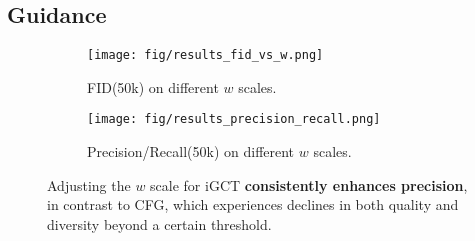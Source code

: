 \vspace{-0.3cm}
\subsection{Guidance}
\label{sec:guidance}
\vspace{-0.15cm}

\begin{figure}[t!]  
    \centering
    \begin{subfigure}[b]{0.44\textwidth}
    \texttt{[image: fig/results\_fid\_vs\_w.png]} 
        \vspace{-1.4em}
        \caption{FID(50k) on different \(w\) scales.}
    \end{subfigure}
    \hfill
    \begin{subfigure}[b]{0.45\textwidth}
    \texttt{[image: fig/results\_precision\_recall.png]} 
        \vspace{-1.4em}
        \caption{Precision/Recall(50k) on different \(w\) scales.}
    \end{subfigure}
    \vspace{-1em}
    \caption{Adjusting the \(w\) scale for iGCT \textbf{consistently enhances precision}, in contrast to CFG, which experiences declines in both quality and diversity beyond a certain threshold. }
    \vspace{-1.5em}
    \label{fig:results_fid_prec_rec}
\end{figure}

